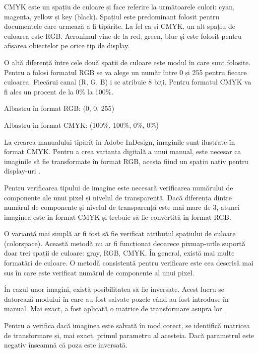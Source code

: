 CMYK este un spațiu de culoare și face referire la următoarele culori: cyan, magenta, yellow și key (black). Spațiul este predominant folosit pentru documentele care urmează a fi tipărite. La fel ca și CMYK, un alt spațiu de culoarea este RGB. Acronimul vine de la red, green, blue și este folosit pentru afișarea obiectelor pe orice tip de display.

O altă diferență între cele două spații de culoare este modul în care sunt folosite. Pentru a folosi formatul RGB se va alege un număr între 0 și 255 pentru fiecare culoarea. Fiecărui canal (R, G, B) i se atribuie 8 biți. Pentru formatul CMYK va fi ales un procent de la 0\% la 100\%.  
\begin{center}
	Albastru în format RGB:
	(0, 0, 255)
	
	Albastru în format CMYK:
	(100\%, 100\%, 0\%, 0\%)
\end{center}

La crearea manualului tipărit în Adobe InDesign, imaginile sunt ilustrate în format CMYK. Pentru a crea varianta digitală a unui manual, este necesar ca imaginile să fie transformate în format RGB, acesta fiind un spațiu nativ pentru display-uri \cite{anderson1996proposal}.

Pentru verificarea tipului de imagine este necesară verificarea numărului de componente ale unui pixel și nivelul de transparență. Dacă diferența dintre numărul de componente și nivelul de transparență este mai mare de 3, atunci imaginea este în format CMYK și trebuie să fie convertită în format RGB.

O variantă mai simplă ar fi fost să fie verificat atributul spațiului de culoare (colorspace). Această metodă nu ar fi funcționat deoarece pixmap-urile suportă doar trei spații de culoare: gray, RGB, CMYK. În general, există mai multe formatări de culoare. O metodă consistentă pentru verificare este cea descrisă mai sus în care este verificat numărul de componente al unui pixel.

În cazul unor imagini, există posibilitatea să fie inversate. Acest lucru se datorează modului în care au fost salvate pozele când au fost introduse în manual. Mai exact, a fost aplicată o matrice de transformare asupra lor. 

Pentru a verifica dacă imaginea este salvată în mod corect, se identifică matricea de transformare și, mai exact, primul parametru al acesteia. Dacă parametrul este negativ înseamnă că poza este inversată.

\vspace{3em}

